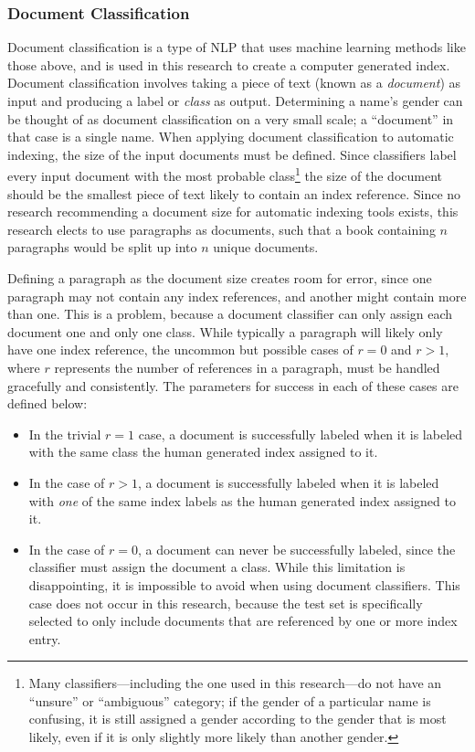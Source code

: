 \subsubsection{Document Classification}
Document classification is a type of NLP that uses machine learning methods like those above, and is used in this research to create a computer generated index.
Document classification involves taking a piece of text (known as a {\it document}) as input and producing a label or {\it class} as output\cite{jurafsky}.
Determining a name's gender can be thought of as document classification on a very small scale; a ``document'' in that case is a single name.
When applying document classification to automatic indexing, the size of the input documents must be defined.
Since classifiers label every input document with the most probable class\footnote{Many classifiers---including the one used in this research---do not have an ``unsure'' or ``ambiguous'' category; if the gender of a particular name is confusing, it is still assigned a gender according to the gender that is most likely, even if it is only slightly more likely than another gender.} the size of the document should be the smallest piece of text likely to contain an index reference.
Since no research recommending a document size for automatic indexing tools exists, this research elects to use paragraphs as documents, such that a book containing $n$ paragraphs would be split up into $n$ unique documents.

Defining a paragraph as the document size creates room for error, since one paragraph may not contain any index references, and another might contain more than one.
This is a problem, because a document classifier can only assign each document one and only one class.
While typically a paragraph will likely only have one index reference, the uncommon but possible cases of $r = 0$ and $r > 1$, where $r$ represents the number of references in a paragraph, must be handled gracefully and consistently.
The parameters for success in each of these cases are defined below:

\begin{itemize}
\item In the trivial $r = 1$ case, a document is successfully labeled when it is labeled with the same class the human generated index assigned to it.
\item In the case of $r > 1$, a document is successfully labeled when it is labeled with {\it one} of the same index labels as the human generated index assigned to it.
\item In the case of $r = 0$, a document can never be successfully labeled, since the classifier must assign the document a class. While this limitation is disappointing, it is impossible to avoid when using document classifiers. This case does not occur in this research, because the test set is specifically selected to only include documents that are referenced by one or more index entry.
\end{itemize}

